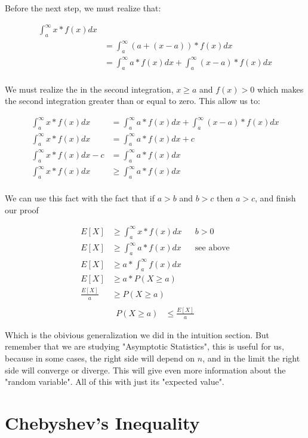 \documentclass[10pt,a4paper]{book}
\begin{document}
Before the next step, we must realize that:

\begin{align*}
	\int_{a}^{\infty}{x*f(x)dx}&\\
	&=\int_{a}^{\infty}{(a+(x-a))*f(x)dx}\\
	&=\int_{a}^{\infty}{a*f(x)dx}+\int_{a}^{\infty}{(x-a)*f(x)dx}\\
\end{align*}

We must realize the in the second integration, $x \ge a$ and $f(x) > 0$ which makes the second integration greater than or equal to zero. This allow us to:

\begin{align*}
	\int_{a}^{\infty}{x*f(x)dx} &=\int_{a}^{\infty}{a*f(x)dx}+\int_{a}^{\infty}{(x-a)*f(x)dx}\\
	\int_{a}^{\infty}{x*f(x)dx}	&=\int_{a}^{\infty}{a*f(x)dx}+c\\
	\int_{a}^{\infty}{x*f(x)dx}	- c &=\int_{a}^{\infty}{a*f(x)dx}\\
	\int_{a}^{\infty}{x*f(x)dx}	&\ge \int_{a}^{\infty}{a*f(x)dx}\\	
\end{align*}

We can use this fact with the fact that if $a>b$ and $b>c$ then $a>c$, and finish our proof

\begin{align*}
	E[X] &\ge \int_{a}^{\infty}{x*f(x)dx} && b > 0\\
	E[X] &\ge \int_{a}^{\infty}{a*f(x)dx} && \text{see above}\\
	E[X] &\ge a*\int_{a}^{\infty}{f(x)dx}\\
	E[X] &\ge a*P(X \ge a)\\
	\frac{E[X]}{a} &\ge P(X \ge a)\\
\end{align*}
\begin{align}
	P(X \ge a) &\le \frac{E[X]}{a}	
\end{align}

Which is the obivious generalization we did in the intuition section. But remember that we are studying "Asymptotic Statistics", this is useful for us, because in some cases, the right side will depend on $n$, and in the limit the right side will converge or diverge. This will give even more information about the "random variable". All of this with just its "expected value".
		
\section{Chebyshev's Inequality}
\end{document}

